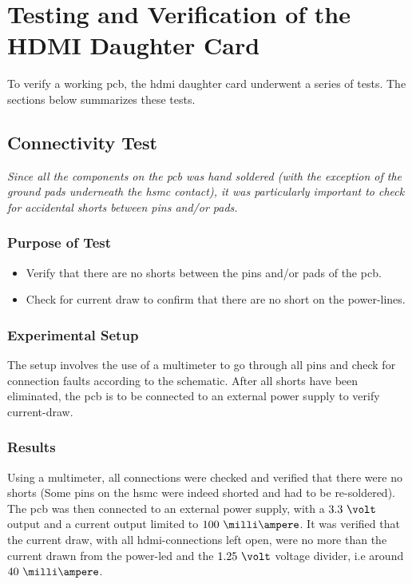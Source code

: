 \documentclass[main.tex]{subfiles}
\begin{document}
\chapter{Testing and Verification of the HDMI Daughter Card}
To verify a working \gls{pcb}, the \gls{hdmi} daughter card underwent a series of tests. The sections below summarizes these tests. 

\section{Connectivity Test}

\textit{Since all the components on the \gls{pcb} was hand soldered (with the exception of the ground pads underneath the \gls{hsmc} contact), it was particularly important to check for accidental shorts between pins and/or pads.}

\subsection{Purpose of Test}

\begin{itemize}\setlength{\itemsep}{10pt}
\item Verify that there are no shorts between the pins and/or pads of the \gls{pcb}. 
\item Check for current draw to confirm that there are no short on the power-lines.
\end{itemize}

\subsection{Experimental Setup}

The setup involves the use of a multimeter to go through all pins and check for connection faults according to the schematic. After all shorts have been eliminated, the \gls{pcb} is to be connected to an external power supply to verify current-draw. 

\subsection{Results}
 Using a multimeter, all connections were checked and verified that there were no shorts (Some pins on the \gls{hsmc} were indeed shorted and had to be re-soldered). The \gls{pcb} was then connected to an external power supply, with a $3.3~\volt$ output and a current output limited to $100~\milli\ampere$. It was verified that the current draw, with all \gls{hdmi}-connections left open, were no more than the current drawn from the power-\acrshort{led} and the $1.25~\volt$ voltage divider, i.e around $40~\milli\ampere$. \\
\end{document}
